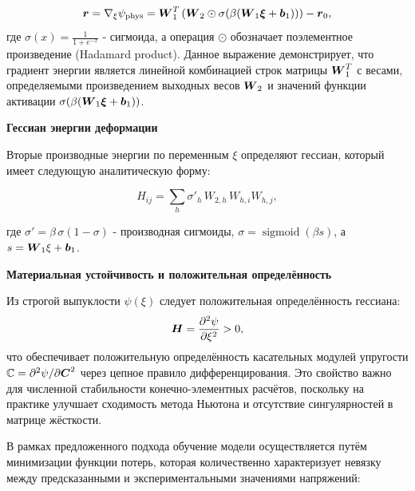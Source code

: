 \begin{equation}
 \boldsymbol{r} = \nabla_\xi \psi_{\mathrm{phys}} = \boldsymbol{W}_1^T \left( \boldsymbol{W}_2 \odot \sigma(\beta (\boldsymbol{W}_1 \boldsymbol{\xi} + \boldsymbol{b}_1)) \right) - \boldsymbol{r}_0,
\label{eq:energy_gradient}
\end{equation}
где $\sigma(x) = \frac{1}{1 + e^{-x}}$ - сигмоида, 
а операция $\odot$ обозначает поэлементное произведение (Hadamard product). 
Данное выражение демонстрирует, что градиент энергии является линейной комбинацией строк матрицы $\boldsymbol{W}_1^T$ с весами, 
определяемыми произведением выходных весов $\boldsymbol{W}_2$ и значений функции активации $\sigma(\beta (\boldsymbol{W}_1 \boldsymbol{\xi} + \boldsymbol{b}_1))$.

\textbf{Гессиан энергии деформации}

Вторые производные энергии по переменным \(\xi\) определяют гессиан, который имеет следующую аналитическую форму:

\begin{equation}
 H_{ij} = \sum_h \sigma'_h\,W_{2,h}\,W_{h,i}W_{h,j},
\label{eq:energy_hessian}
\end{equation}

где $\sigma' = \beta\,\sigma(1-\sigma)$ - производная сигмоиды, 
$\sigma=\operatorname{sigmoid}(\beta s)$, а $s=\boldsymbol{W}_1\xi+\boldsymbol{b}_1$.

\textbf{Материальная устойчивость и положительная определённость}


Из строгой выпуклости \(\psi(\xi)\) следует положительная определённость гессиана:
\begin{equation}
 \boldsymbol{H} = \frac{\partial^2\psi}{\partial\xi^2} > 0,
\label{eq:positive_hessian}
\end{equation}
что обеспечивает положительную определённость касательных модулей упругости 
$\mathbb{C} = \partial^2\psi/\partial\boldsymbol{C}^2$ через цепное правило дифференцирования. 
Это свойство важно для численной стабильности конечно-элементных расчётов, 
поскольку на практике улучшает сходимость метода Ньютона и отсутствие сингулярностей в матрице жёсткости.


В рамках предложенного подхода обучение модели осуществляется путём минимизации функции потерь, 
которая количественно характеризует невязку между предсказанными и экспериментальными значениями напряжений:

